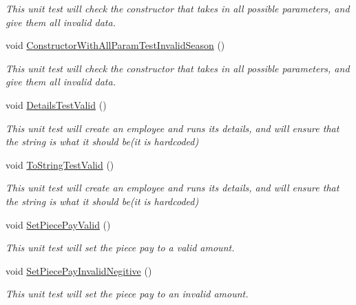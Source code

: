 \begin{DoxyCompactItemize}
\begin{DoxyCompactList}\small\item\em This unit test will check the constructor that takes in all possible parameters, and give them all invalid data. \end{DoxyCompactList}\item 
void \hyperlink{class_my_all_employee_1_1_tests_1_1_seasonal_employee_tests_ab37732a0aebe30a6c1764252a0bea3bf}{Constructor\+With\+All\+Param\+Test\+Invalid\+Season} ()
\begin{DoxyCompactList}\small\item\em This unit test will check the constructor that takes in all possible parameters, and give them all invalid data. \end{DoxyCompactList}\item 
void \hyperlink{class_my_all_employee_1_1_tests_1_1_seasonal_employee_tests_a71d96e76f23a2ba0addbf83c6b969d52}{Details\+Test\+Valid} ()
\begin{DoxyCompactList}\small\item\em This unit test will create an employee and runs it\textquotesingle{}s details, and will ensure that the string is what it should be(it is hardcoded) \end{DoxyCompactList}\item 
void \hyperlink{class_my_all_employee_1_1_tests_1_1_seasonal_employee_tests_a712de60d04295ef05d220830954574a7}{To\+String\+Test\+Valid} ()
\begin{DoxyCompactList}\small\item\em This unit test will create an employee and runs it\textquotesingle{}s details, and will ensure that the string is what it should be(it is hardcoded) \end{DoxyCompactList}\item 
void \hyperlink{class_my_all_employee_1_1_tests_1_1_seasonal_employee_tests_ab39595d763f315b9071db67af4ddfdb5}{Set\+Piece\+Pay\+Valid} ()
\begin{DoxyCompactList}\small\item\em This unit test will set the piece pay to a valid amount. \end{DoxyCompactList}\item 
void \hyperlink{class_my_all_employee_1_1_tests_1_1_seasonal_employee_tests_a54b31e16c0b0dc7a6167aa95f03bde9d}{Set\+Piece\+Pay\+Invalid\+Negitive} ()
\begin{DoxyCompactList}\small\item\em This unit test will set the piece pay to an invalid amount. \end{DoxyCompactList}\item 

\end{DoxyCompactItemize}
